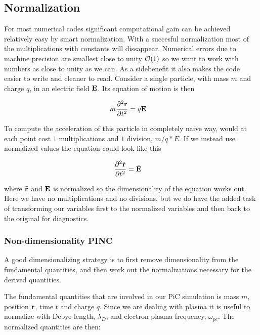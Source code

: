 \subsection{Normalization}
    For most numerical codes significant computational gain can be achieved
    relatively easy by smart normalization. With a succesful normalization most
    of the multiplications with constants will dissappear. Numerical errors
    due to machine precision are smallest close to unity \(\order{1}\) \citep{hjorth-jensen_computational_????} so we
    want to work with numbers as close to unity as we can. As a sidebenefit it also
    makes the code easier to write and cleaner to read. Consider a single particle,
    with mass \(m\) and charge \(q\), in an electric field \(\vb{E}\). Its equation of motion is then

    \begin{align}
        m\pdv[2]{\vb{r}}{t} &= q\vb{E}
    \end{align}

    To compute the acceleration of this particle in completely naive way, would at each point
    cost \(1\) multiplications and \(1\) division, \(m/q*E\). If we instead use normalized
    values the equation could look like this

    \begin{align}
        \pdv[2]{\tilde {\vb{r}}}{t} &= \tilde{\vb{E}}
    \end{align}

    where \(\tilde {\vb{r}}\) and \(\tilde{\vb{E}}\) is normalized so the dimensionality of the
    equation works out. Here we have no multiplications and no divisions,
    but we do have the added task of transforming our variables first to the normalized variables
    and then back to the original for diagnostics.

    \subsubsection{Non-dimensionality PINC}
        A good dimensionalizing strategy is to first remove
        dimensionality from the fundamental quantities, and then work out the
        normalizations necessary for the derived quantities.

        The fundamental quantities that are involved in our PiC simulation is
        mass \(m\), position \(\vb{r}\), time \(t\) and charge \(q\). Since we are dealing with
        plasma it is useful to normalize with Debye-length, \(\lambda_D\), and electron plasma frequency, \(\omega_{pe}\).
        The normalized quantities are then:

